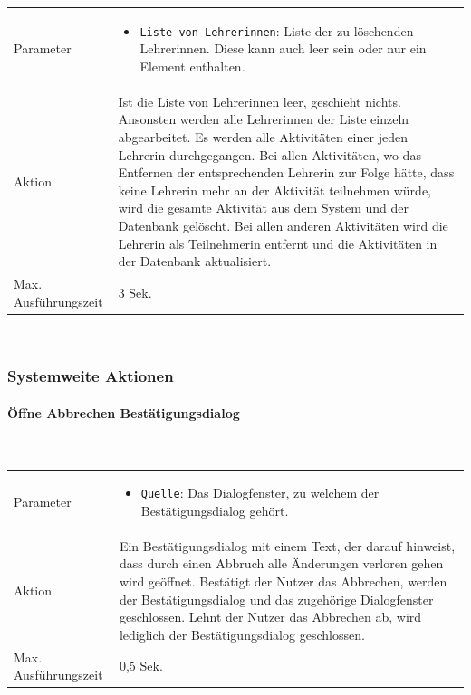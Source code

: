\documentclass[fontsize=12pt,paper=a4,twoside]{scrartcl}
\begin{document}
\begin{tabularx}{\textwidth}{p{4cm}X}
Parameter & \begin{itemize}[itemsep=0pt, leftmargin = 0.5cm]
			\item \texttt{Liste von Lehrerinnen}: Liste der zu löschenden Lehrerinnen. Diese kann auch leer sein oder nur ein Element enthalten.
			\end{itemize}\\
Aktion & Ist die Liste von Lehrerinnen leer, geschieht nichts. Ansonsten werden alle Lehrerinnen der Liste einzeln abgearbeitet. Es werden alle Aktivitäten einer jeden Lehrerin durchgegangen. Bei allen Aktivitäten, wo das Entfernen der entsprechenden Lehrerin zur Folge hätte, dass keine Lehrerin mehr an der Aktivität teilnehmen würde, wird die gesamte Aktivität aus dem System und der Datenbank gelöscht. Bei allen anderen Aktivitäten wird die Lehrerin als Teilnehmerin entfernt und die Aktivitäten in der Datenbank aktualisiert. \\
Max. Ausführungszeit & 3 Sek. 
\end{tabularx}\\

\subsubsection{Systemweite Aktionen}

\paragraph{Öffne Abbrechen Bestätigungsdialog}\mbox{}\\

\begin{tabularx}{\textwidth}{p{4cm}X}
Parameter & \begin{itemize}[itemsep=0pt, leftmargin = 0.5cm]
			\item \texttt{Quelle}: Das Dialogfenster, zu welchem der Bestätigungsdialog gehört.
			\end{itemize}\\
Aktion & Ein Bestätigungsdialog mit einem Text, der darauf hinweist, dass durch einen Abbruch alle Änderungen verloren gehen wird geöffnet. Bestätigt der Nutzer das Abbrechen, werden der Bestätigungsdialog und das zugehörige Dialogfenster geschlossen. Lehnt der Nutzer das Abbrechen ab, wird lediglich der Bestätigungsdialog geschlossen.\\
Max. Ausführungszeit & 0,5 Sek. 
\end{tabularx}\\
\end{document}
